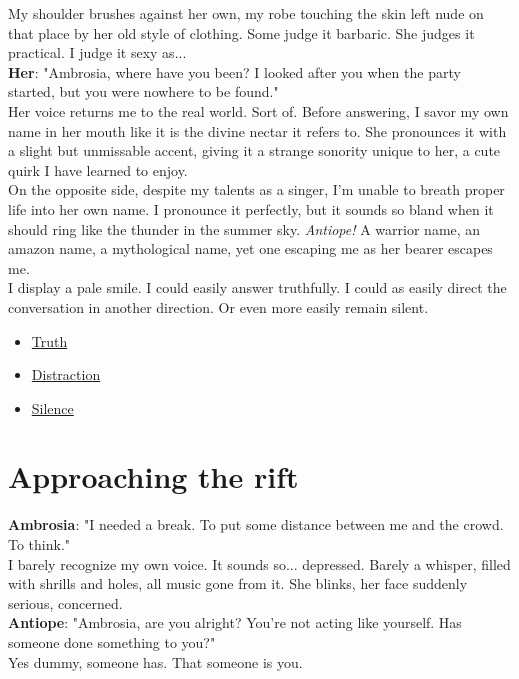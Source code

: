 \documentclass{report}
\newcommand{\speaker}[1]{
	\textbf{#1}: 
}
\newcommand{\glink}[2]{
	\hyperref[#1]{#2}
}
\newcommand{\gsection}[1]{
	\section*{#1}
	\label{#1}
}
\begin{document}
My shoulder brushes against her own, my robe touching the skin left nude on that place by her old style of clothing. Some judge it barbaric. She judges it practical. I judge it sexy as...\\

\speaker{Her} "Ambrosia, where have you been? I looked after you when the party started, but you were nowhere to be found."\\

Her voice returns me to the real world. Sort of. Before answering, I savor my own name in her mouth like it is the divine nectar it refers to. She pronounces it with a slight but unmissable accent, giving it a strange sonority unique to her, a cute quirk I have learned to enjoy.\\

On the opposite side, despite my talents as a singer, I'm unable to breath proper life into her own name. I pronounce it perfectly, but it sounds so bland when it should ring like the thunder in the summer sky. \emph{Antiope!} A warrior name, an amazon name, a mythological name, yet one escaping me as her bearer escapes me.\\

I display a pale smile. I could easily answer truthfully. I could as easily direct the conversation in another direction. Or even more easily remain silent.

\begin{itemize}
	\item \glink{Approaching the rift}{Truth}
	\item \glink{Sport}{Distraction}
	\item \glink{Silence}{Silence}
\end{itemize}

\gsection{Approaching the rift}

\speaker{Ambrosia} "I needed a break. To put some distance between me and the crowd. To think."\\

I barely recognize my own voice. It sounds so... depressed. Barely a whisper, filled with shrills and holes, all music gone from it. She blinks, her face suddenly serious, concerned.\\

\speaker{Antiope} "Ambrosia, are you alright? You're not acting like yourself. Has someone done something to you?"\\

Yes dummy, someone has. That someone is you.
\end{document}
